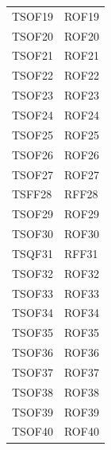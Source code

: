 \documentclass[../PianoDiQualifica_v4.0.0.tex]{subfiles}
\begin{document}
\begin{longtable}[c] { >{\centering\arraybackslash}p{3cm} >{\centering\arraybackslash}p{3cm}}
			\midrule
			\addlinespace[0.3em]
			TSOF19 & ROF19 \\
			\addlinespace[0.3em]
			\midrule
			\addlinespace[0.3em]
			TSOF20 & ROF20 \\
			\addlinespace[0.3em]
			\midrule
			\addlinespace[0.3em]
			TSOF21 & ROF21 \\
			\addlinespace[0.3em]
			\midrule
			\addlinespace[0.3em]
			TSOF22 & ROF22 \\
			\addlinespace[0.3em]
			\midrule
			\addlinespace[0.3em]
			TSOF23 & ROF23 \\
			\addlinespace[0.3em]
			\midrule
			\addlinespace[0.3em]
			TSOF24 & ROF24 \\
			\addlinespace[0.3em]
			\midrule
			\addlinespace[0.3em]
			TSOF25 & ROF25 \\
			\addlinespace[0.3em]
			\midrule
			\addlinespace[0.3em]
			TSOF26 & ROF26 \\
			\addlinespace[0.3em]
			\midrule
			\addlinespace[0.3em]
			TSOF27 & ROF27 \\
			\addlinespace[0.3em]
			\midrule
			\addlinespace[0.3em]
			TSFF28 & RFF28 \\
			\addlinespace[0.3em]
			\midrule
			\addlinespace[0.3em]
			TSOF29 & ROF29 \\
			\addlinespace[0.3em]
			\midrule
			\addlinespace[0.3em]
			TSOF30 & ROF30 \\
			\addlinespace[0.3em]
			\midrule
			\addlinespace[0.3em]
			TSQF31 & RFF31 \\
			\addlinespace[0.3em]
			\midrule
			\addlinespace[0.3em]
			TSOF32 & ROF32 \\
			\addlinespace[0.3em]
			\midrule
			\addlinespace[0.3em]
			TSOF33 & ROF33 \\
			\addlinespace[0.3em]
			\midrule
			\addlinespace[0.3em]
			TSOF34 & ROF34 \\
			\addlinespace[0.3em]
			\midrule
			\addlinespace[0.3em]
			TSOF35 & ROF35 \\
			\addlinespace[0.3em]
			\midrule
			\addlinespace[0.3em]
			TSOF36 & ROF36 \\
			\addlinespace[0.3em]
			\midrule
			\addlinespace[0.3em]
			TSOF37 & ROF37 \\
			\addlinespace[0.3em]
			\midrule
			\addlinespace[0.3em]
			TSOF38 & ROF38 \\
			\addlinespace[0.3em]
			\midrule
			\addlinespace[0.3em]
			TSOF39 & ROF39 \\
			\addlinespace[0.3em]
			\midrule
			\addlinespace[0.3em]
			TSOF40 & ROF40 \\

\end{longtable}
\end{document}
